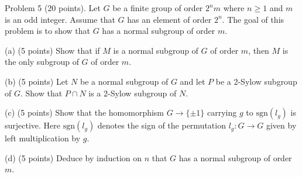 \begin{exercise}
\label{algebra:2016:5}
Problem 5 (20 points). Let $G$ be a finite group of order $2^n m$ where $n \geq 1$ and $m$ is an odd integer. Assume that $G$ has an element of order $2^n$. The goal of this problem is to show that $G$ has a normal subgroup of order $m$.

(a) (5 points) Show that if $M$ is a normal subgroup of $G$ of order $m$, then $M$ is the only subgroup of $G$ of order $m$.

(b) (5 points) Let $N$ be a normal subgroup of $G$ and let $P$ be a 2-Sylow subgroup of $G$. Show that $P \cap N$ is a 2-Sylow subgroup of $N$.

(c) (5 points) Show that the homomorphism $G \to \{\pm 1\}$ carrying $g$ to $\mathrm{sgn}(l_g)$ is surjective. Here $\mathrm{sgn}(l_g)$ denotes the sign of the permutation $l_g: G \to G$ given by left multiplication by $g$.

(d) (5 points) Deduce by induction on $n$ that $G$ has a normal subgroup of order $m$.
\end{exercise}
